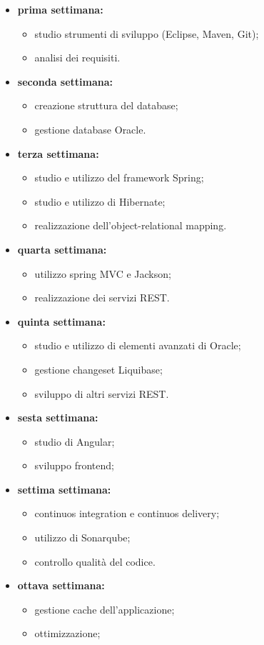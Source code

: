 \begin{itemize}
    \item \textbf{prima settimana:}
    \begin{itemize}
        \item studio strumenti di sviluppo (Eclipse, Maven, Git);
        \item analisi dei requisiti.
    \end{itemize}
    \item \textbf{seconda settimana:}
    \begin{itemize}
        \item creazione struttura del database;
        \item gestione database Oracle.
    \end{itemize}
    \item \textbf{terza settimana:}
    \begin{itemize}
        \item studio e utilizzo del framework Spring;
        \item studio e utilizzo di Hibernate;
        \item realizzazione dell'object-relational mapping. 
    \end{itemize}
    \item \textbf{quarta settimana:}
    \begin{itemize}
        \item utilizzo spring MVC e Jackson;
        \item realizzazione dei servizi REST.
    \end{itemize}
    \item \textbf{quinta settimana:}
    \begin{itemize}
        \item studio e utilizzo di elementi avanzati di Oracle;
        \item gestione changeset Liquibase;
        \item sviluppo di altri servizi REST. 
    \end{itemize}
    \item \textbf{sesta settimana:}
    \begin{itemize}
        \item studio di Angular;
        \item sviluppo frontend;
    \end{itemize}
    \item \textbf{settima settimana:}
    \begin{itemize}
        \item continuos integration e continuos delivery;
        \item utilizzo di Sonarqube;
        \item controllo qualità del codice.
    \end{itemize}
    \item \textbf{ottava settimana:}
    \begin{itemize}
        \item gestione cache dell'applicazione;
        \item ottimizzazione;
    \end{itemize}
\end{itemize}
